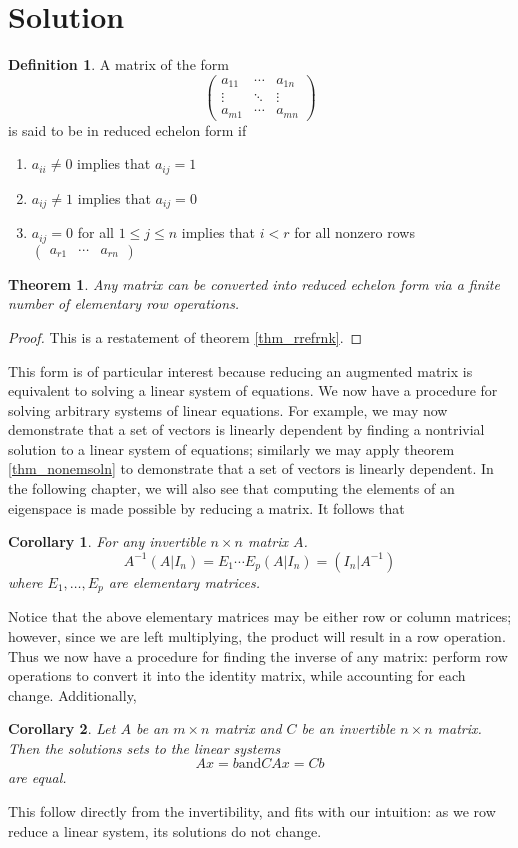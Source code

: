 \documentclass[oneside, 12pt]{book}
\newtheorem{thm}{Theorem}[section]
\newtheorem{cor}{Corollary}[section]
\theoremstyle{definition}
\newtheorem{defn}{Definition}[section]
\begin{document}
\section{Solution}
\begin{defn}
\label{defn_rref}
A matrix of the form \[\begin{pmatrix} a_{11} & \cdots & a_{1n}\\ \vdots & \ddots & \vdots \\a_{m1} & \cdots & a_{mn}\end{pmatrix}\] is said to be in reduced echelon form if
\begin{enumerate}
  \item $a_{ii}\neq 0$ implies that $a_{ij}=1$
  \item $a_{ij} \neq 1$ implies that $a_{ij}=0$
  \item $a_{ij}=0$ for all $1\leq j \leq n$ implies that $i < r$ for all nonzero rows $\begin{pmatrix}a_{r1} & \cdots & a_{rn}\end{pmatrix}$
\end{enumerate}
\end{defn}
\begin{thm}
\label{thm_rref}
Any matrix can be converted into reduced echelon form via a finite number of elementary row operations.
\end{thm}
\begin{proof}
This is a restatement of theorem \ref{thm_rrefrnk}.
\end{proof}
This form is of particular interest because reducing an augmented matrix is equivalent to solving a linear system of equations. We now have a
procedure for solving arbitrary systems of linear equations. For example, we may now demonstrate that a set of vectors is linearly dependent by
finding a nontrivial solution to a linear system of equations; similarly we may apply theorem \ref{thm_nonemsoln} to demonstrate that a set of vectors is linearly dependent. In the following chapter, we will also see that computing the elements of an eigenspace is made possible by reducing a matrix.
It follows that
\begin{cor}
\label{cor_soln}
For any invertible $n \times n$ matrix $A$.
\[A^{-{1}}(A|I_{n}) = E_{1} \cdots E_{p}(A|I_{n})=(I_{n}|A^{-1})\]
where $E_{1}, \dots, E_{p}$ are elementary matrices.
\end{cor}
Notice that the above elementary matrices may be either row or column matrices; however, since we are left multiplying, the product will result in a
row operation.
Thus we now have a procedure for finding the inverse of any matrix: perform row operations to convert it into the identity matrix, while accounting for each change.
Additionally,
\begin{cor}
\label{cor_solninvar}
Let $A$ be an $m \times n$ matrix and $C$ be an invertible $n \times n$ matrix. Then the solutions sets to the linear systems
\[Ax=b \text{and} CAx=Cb \] are equal.
\end{cor}
This follow directly from the invertibility, and fits with our intuition: as we row reduce a linear system, its solutions do not change.
\end{document}
